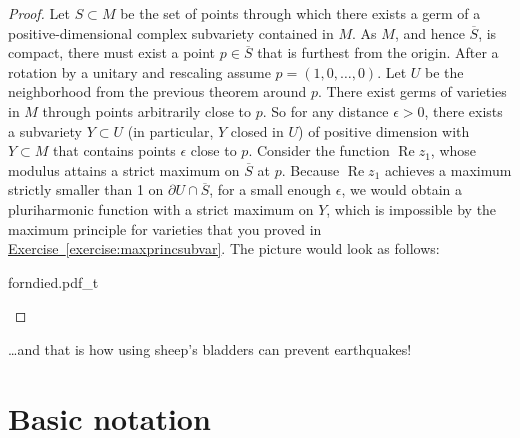 \documentclass[12pt,openany]{book}
\renewcommand{\Re}{\operatorname{Re}}
\theoremstyle{plain}
\theoremstyle{remark}
\theoremstyle{definition}
\theoremstyle{exercise}
\theoremstyle{example}
\newcommand{\exerciseref}[1]{\hyperref[#1]{Exercise~\ref*{#1}}}
\begin{document}
\begin{proof}
Let $S \subset M$ be the set of points through which there exists 
a germ of a positive-dimensional complex subvariety contained in $M$.
As $M$, and hence $\overline{S}$, is compact,
there must exist a point $p \in \overline{S}$
that is furthest from
the origin.  After a rotation by a unitary and rescaling assume
$p=(1,0,\ldots,0)$.  Let $U$ be the neighborhood from the previous
theorem around $p$.  There exist germs of varieties in $M$ through points
arbitrarily close to $p$.  So for any distance $\epsilon > 0$,
there exists a subvariety $Y \subset U$ (in particular, $Y$ closed in $U$)
of positive dimension with $Y \subset M$ that contains points 
$\epsilon$ close to $p$.  Consider the function $\Re z_1$, whose modulus attains a
strict maximum on $\overline{S}$ at $p$.  Because $\Re z_1$ achieves a maximum
strictly smaller than 1 on $\partial U \cap \overline{S}$, for a small enough $\epsilon$,
we would obtain a pluriharmonic function with a strict
maximum on $Y$, which is impossible by the maximum principle for
varieties that you proved in \exerciseref{exercise:maxprincsubvar}.
The picture would look as follows:
\begin{center}
\medskip
{forndied.pdf_t}
\end{center}
\end{proof}

\vspace*{1in}

\ldots and that is how using sheep's bladders can prevent
earthquakes!


\appendix


\chapter{Basic notation} \label{ap:basicnotation}

\end{document}
